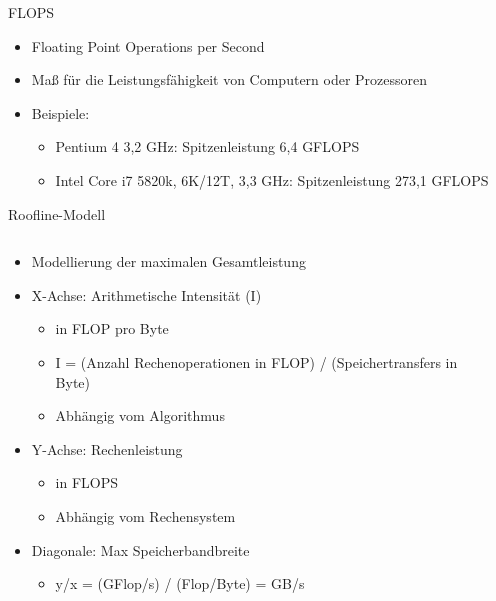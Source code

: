 \documentclass[
  german,            %
  aspectratio=169,    %
]{tumbeamer}
\begin{document}
\begin{frame}[c, fragile]{FLOPS}{}
	\begin{itemize}
		\item Floating Point Operations per Second
		\item Maß für die Leistungsfähigkeit von Computern oder Prozessoren
		\item Beispiele:
		\begin{itemize}
			\item Pentium 4 3,2 GHz: Spitzenleistung 6,4 GFLOPS
			\item Intel Core i7 5820k, 6K/12T, 3,3 GHz: Spitzenleistung 273,1 GFLOPS
		\end{itemize}
	\end{itemize}
\end{frame}

\begin{frame}[c, fragile]{Roofline-Modell}{}
	\begin{columns}[c]
		\begin{column}{0.51\textwidth}
			\begin{itemize}
				\item Modellierung der maximalen Gesamtleistung
				\item X-Achse: Arithmetische Intensität (I)
				\begin{itemize}
					\item in FLOP pro Byte
					\item I = (Anzahl Rechenoperationen in FLOP) / (Speichertransfers in Byte)
					\item Abhängig vom Algorithmus
				\end{itemize}
				\item Y-Achse: Rechenleistung
				\begin{itemize}
					\item in FLOPS
					\item Abhängig vom Rechensystem
				\end{itemize}
				\item Diagonale: Max Speicherbandbreite
				\begin{itemize}
					\item y/x = (GFlop/s) / (Flop/Byte) = GB/s
				\end{itemize}
			\end{itemize}
		\end{column}
		\begin{column}{0.5\textwidth}
			\centering

\end{column}
\end{columns}
\end{frame}
\end{document}
